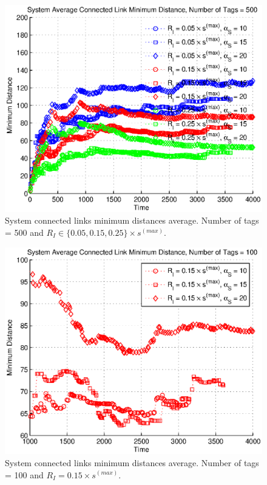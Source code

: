 \begin{figure}
\centering
\includegraphics[width=5in]{Chapter_4_Figures/sys_links_min_dist_500tags_all.eps}
\caption{System connected links minimum distances average. Number of tags = 500 and $R_I \in \{0.05, 0.15, 0.25\} \times s^{(max)}$.}
\label{Figure: sys_links_min_dist_500tags_all.eps}
\end{figure}
\begin{figure}
\centering
\includegraphics[width=5in]{Chapter_4_Figures/sys_links_min_dist_100tags_15diam.eps}
\caption{System connected links minimum distances average. Number of tags = 100 and $R_I = 0.15 \times s^{(max)}$.}
\label{Figure: sys_links_min_dist_100tags_15diam.eps}
\end{figure}
\clearpage

